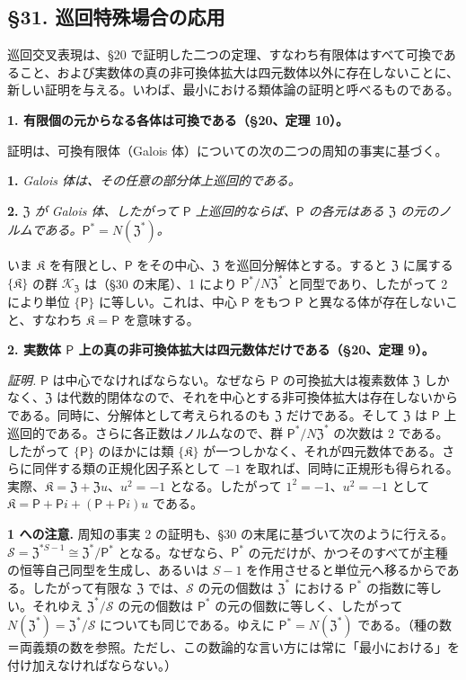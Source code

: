 \subsection*{\S 31. 巡回特殊場合の応用}\label{anwendungen-des-zyklischen-spezialfalles}

巡回交叉表現は、\S 20 で証明した二つの定理、すなわち有限体はすべて可換であること、および実数体の真の非可換体拡大は四元数体以外に存在しないことに、新しい証明を与える。いわば、最小における類体論の証明と呼べるものである。

\noindent\textbf{1. 有限個の元からなる各体は可換である（\S 20、定理 10）。}

証明は、可換有限体（Galois 体）についての次の二つの周知の事実に基づく。

\noindent\textbf{1.} \emph{Galois 体は、その任意の部分体上巡回的である。}

\noindent\textbf{2.} \emph{\(\mathfrak Z\) が Galois 体、したがって \(\mathsf P\) 上巡回的ならば、\(\mathsf P\) の各元はある \(\mathfrak Z\) の元のノルムである。\(\mathsf P^*=N(\mathfrak Z^*)\)。}

いま \(\mathfrak K\) を有限とし、\(\mathsf P\) をその中心、\(\mathfrak Z\) を巡回分解体とする。すると \(\mathfrak Z\) に属する \(\{\mathfrak K\}\) の群 \(\mathscr K_{\mathfrak Z}\) は（\S 30 の末尾）、1 により \(\mathsf P^*/N\mathfrak Z^*\) と同型であり、したがって 2 により単位 \(\{\mathsf P\}\) に等しい。これは、中心 \(\mathsf P\) をもつ \(\mathsf P\) と異なる体が存在しないこと、すなわち \(\mathfrak K=\mathsf P\) を意味する。

\noindent\textbf{2. 実数体 \(\mathsf P\) 上の真の非可換体拡大は四元数体だけである（\S 20、定理 9）。}

\noindent\emph{証明.} \(\mathsf P\) は中心でなければならない。なぜなら \(\mathsf P\) の可換拡大は複素数体 \(\mathfrak Z\) しかなく、\(\mathfrak Z\) は代数的閉体なので、それを中心とする非可換体拡大は存在しないからである。同時に、分解体として考えられるのも \(\mathfrak Z\) だけである。そして \(\mathfrak Z\) は \(\mathsf P\) 上巡回的である。さらに各正数はノルムなので、群 \(\mathsf P^*/N\mathfrak Z^*\) の次数は 2 である。したがって \(\{\mathsf P\}\) のほかには類 \(\{\mathfrak K\}\) が一つしかなく、それが四元数体である。さらに同伴する類の正規化因子系として \(-1\) を取れば、同時に正規形も得られる。実際、\(\mathfrak K=\mathfrak Z+\mathfrak Zu\)、\(u^2=-1\) となる。したがって \(1^2=-1\)、\(u^2=-1\) として \(\mathfrak K=\mathsf P+\mathsf Pi+(\mathsf P+\mathsf Pi)u\) である。

\noindent\textbf{1 への注意.} 周知の事実 2 の証明も、\S 30 の末尾に基づいて次のように行える。\(\mathscr S=\mathfrak Z^{*S-1}\cong\mathfrak Z^*/\mathsf P^*\) となる。なぜなら、\(\mathsf P^*\) の元だけが、かつそのすべてが主種の恒等自己同型を生成し、あるいは \(S-1\) を作用させると単位元へ移るからである。したがって有限な \(\mathfrak Z\) では、\(\mathscr S\) の元の個数は \(\mathfrak Z^*\) における \(\mathsf P^*\) の指数に等しい。それゆえ \(\mathfrak Z^*/\mathscr S\) の元の個数は \(\mathsf P^*\) の元の個数に等しく、したがって \(N(\mathfrak Z^*)=\mathfrak Z^*/\mathscr S\) についても同じである。ゆえに \(\mathsf P^*=N(\mathfrak Z^*)\) である。（種の数＝両義類の数を参照。ただし、この数論的な言い方には常に「最小における」を付け加えなければならない。）

